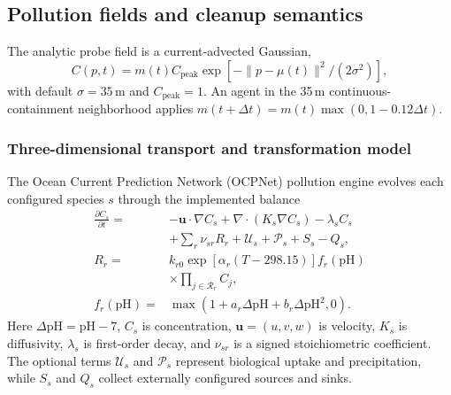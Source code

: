 \subsection{Pollution fields and cleanup semantics}

The analytic probe field is a current-advected Gaussian,
\begin{equation}
C(p,t)=m(t)C_{\mathrm{peak}}\exp[-\|p-\mu(t)\|^2/(2\sigma^2)],
\end{equation}
with default $\sigma=35$\,m and $C_{\mathrm{peak}}=1$. An agent in the 35\,m continuous-containment neighborhood applies $m(t+\Delta t)=m(t)\max(0,1-0.12\Delta t)$.

\subsubsection{Three-dimensional transport and transformation model}

The Ocean Current Prediction Network (OCPNet) pollution engine evolves each configured species $s$ through the implemented balance
\begin{align}
\frac{\partial C_s}{\partial t}={}&
-\mathbf u\!\cdot\!\nabla C_s
+\nabla\!\cdot\!(K_s\nabla C_s)-\lambda_s C_s \nonumber\\
&+\sum_r \nu_{sr}R_r+\mathcal U_s+\mathcal P_s+S_s-Q_s,
\label{eq:pollution_balance}\\
R_r={}&k_{r0}\exp[\alpha_r(T-298.15)]f_r(\mathrm{pH}) \nonumber\\
&\times\prod_{j\in\mathcal R_r}C_j,
\label{eq:pollution_reaction}\\
f_r(\mathrm{pH})={}&
\max\!\left(1+a_r\Delta\mathrm{pH}
+b_r\Delta\mathrm{pH}^2,0\right). \nonumber
\end{align}
Here $\Delta\mathrm{pH}=\mathrm{pH}-7$, $C_s$ is concentration, $\mathbf u=(u,v,w)$ is velocity, $K_s$ is diffusivity, $\lambda_s$ is first-order decay, and $\nu_{sr}$ is a signed stoichiometric coefficient. The optional terms $\mathcal U_s$ and $\mathcal P_s$ represent biological uptake and precipitation, while $S_s$ and $Q_s$ collect externally configured sources and sinks.

